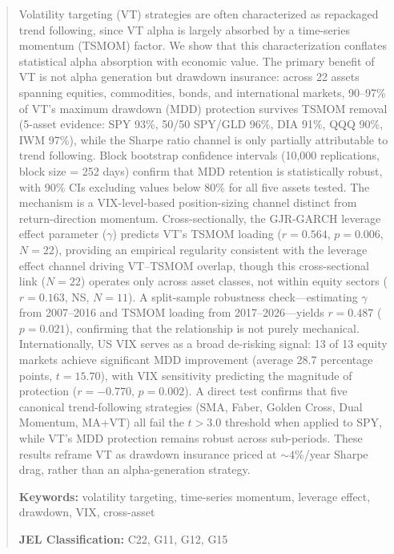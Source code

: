 
\begin{abstract}
\noindent
Volatility targeting (VT) strategies are often characterized as repackaged trend following, since VT alpha is largely absorbed by a time-series momentum (TSMOM) factor. We show that this characterization conflates statistical alpha absorption with economic value. The primary benefit of VT is not alpha generation but drawdown insurance: across 22 assets spanning equities, commodities, bonds, and international markets, 90--97\% of VT's maximum drawdown (MDD) protection survives TSMOM removal (5-asset evidence: SPY 93\%, 50/50 SPY/GLD 96\%, DIA 91\%, QQQ 90\%, IWM 97\%), while the Sharpe ratio channel is only partially attributable to trend following. Block bootstrap confidence intervals (10,000 replications, block size = 252 days) confirm that MDD retention is statistically robust, with 90\% CIs excluding values below 80\% for all five assets tested. The mechanism is a VIX-level-based position-sizing channel distinct from return-direction momentum. Cross-sectionally, the GJR-GARCH leverage effect parameter ($\gamma$) predicts VT's TSMOM loading ($r = 0.564$, $p = 0.006$, $N = 22$), providing an empirical regularity consistent with the leverage effect channel driving VT--TSMOM overlap, though this cross-sectional link ($N = 22$) operates only across asset classes, not within equity sectors ($r = 0.163$, NS, $N = 11$). A split-sample robustness check---estimating $\gamma$ from 2007--2016 and TSMOM loading from 2017--2026---yields $r = 0.487$ ($p = 0.021$), confirming that the relationship is not purely mechanical. Internationally, US VIX serves as a broad de-risking signal: 13 of 13 equity markets achieve significant MDD improvement (average 28.7 percentage points, $t = 15.70$), with VIX sensitivity predicting the magnitude of protection ($r = -0.770$, $p = 0.002$). A direct test confirms that five canonical trend-following strategies (SMA, Faber, Golden Cross, Dual Momentum, MA+VT) all fail the \citet{harvey2016} $t > 3.0$ threshold when applied to SPY, while VT's MDD protection remains robust across sub-periods. These results reframe VT as drawdown insurance priced at ${\sim}4\%$/year Sharpe drag, rather than an alpha-generation strategy.

\medskip
\noindent
\textbf{Keywords:} volatility targeting, time-series momentum, leverage effect, drawdown, VIX, cross-asset

\medskip
\noindent
\textbf{JEL Classification:} C22, G11, G12, G15
\end{abstract}

